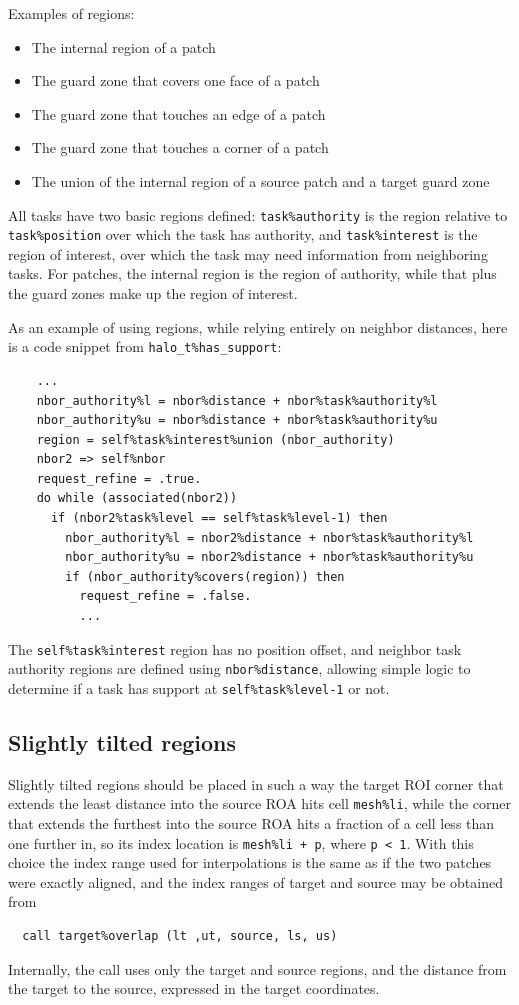 \documentclass[paper=a4,fontsize=11pt]{scrartcl}
\numberwithin{equation}{section}		%
\numberwithin{figure}{section}			%
\numberwithin{table}{section}				%
\newcommand{\codecolor}{\color{Blue}}
\newcommand{\Code}[1]{{\codecolor\texttt{#1}}}
\begin{document}
Examples of regions:
\begin{itemize}
\item The internal region of a patch
\item The guard zone that covers one face of a patch
\item The guard zone that touches an edge of a patch
\item The guard zone that touches a corner of a patch
\item The union of the internal region of a source patch and a target guard zone
\end{itemize}
All tasks have two basic regions defined: \Code{task\%authority} is the region relative to \Code{task\%position} over which the task has authority, and \Code{task\%interest} is the region of interest, over which the task may need information from neighboring tasks.  For patches, the internal region is the region of authority, while that plus the guard zones make up the region of interest.

As an example of using regions, while relying entirely on neighbor distances, here is a code snippet from \Code{halo\_t\%has\_support}:
{\codecolor \begin{verbatim}
    ...
    nbor_authority%l = nbor%distance + nbor%task%authority%l
    nbor_authority%u = nbor%distance + nbor%task%authority%u
    region = self%task%interest%union (nbor_authority)
    nbor2 => self%nbor
    request_refine = .true.
    do while (associated(nbor2)) 
      if (nbor2%task%level == self%task%level-1) then
        nbor_authority%l = nbor2%distance + nbor%task%authority%l
        nbor_authority%u = nbor2%distance + nbor%task%authority%u
        if (nbor_authority%covers(region)) then
          request_refine = .false.
          ...
\end{verbatim}}
The \Code{self\%task\%interest} region has no position offset, and neighbor task authority regions are defined using \Code{nbor\%distance}, allowing simple logic to determine if a task has support at \Code{self\%task\%level-1} or not.

\subsection{Slightly tilted regions}
Slightly tilted regions should be placed in such a way the target ROI corner that extends the least distance into the source ROA hits cell \Code{mesh\%li}, while the corner that extends the furthest into the source ROA hits a fraction of a cell less than one further in, so its index location is \Code{mesh\%li + p}, where \Code{p < 1}.  With this choice the index range used for interpolations is the same as if the two patches were exactly aligned, and the index ranges of target and source may be obtained from
{\codecolor\begin{verbatim}
  call target%overlap (lt ,ut, source, ls, us)
\end{verbatim}}
Internally, the call uses only the target and source regions, and the distance from the target to the source, expressed in the target coordinates.
\end{document}
